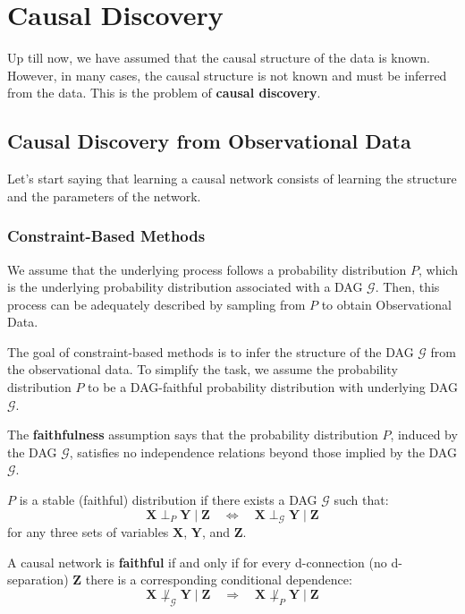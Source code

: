 \chapter{Causal Discovery}
Up till now, we have assumed that the causal structure of the data is known. However,
in many cases, the causal structure is not known and must be inferred from the data.
This is the problem of \textbf{causal discovery}.

\section{Causal Discovery from Observational Data}
Let's start saying that learning a causal network consists of learning the
structure and the parameters of the network.
\subsection{Constraint-Based Methods}
We assume that the underlying process follows a probability distribution $P$, which
is the underlying probability distribution associated with a DAG $\mathcal{G}$.
Then, this process can be adequately described by sampling from $P$ to obtain
Observational Data.

The goal of constraint-based methods is to infer the structure of the DAG $\mathcal{G}$
from the observational data. To simplify the task, we assume the probability
distribution $P$ to be a DAG-faithful probability distribution with underlying
DAG $\mathcal{G}$.

The \textbf{faithfulness} assumption says that the probability distribution $P$,
induced by the DAG $\mathcal{G}$, satisfies no independence relations beyond
those implied by the DAG $\mathcal{G}$.

\begin{definition}
    $P$ is a stable (faithful) distribution if there exists a DAG $\mathcal{G}$
    such that:
    \begin{equation}
        \mathbf{X} \perp_{P} \mathbf{Y} \mid \mathbf{Z} \quad \iff \quad \mathbf{X} \perp_{\mathcal{G}} \mathbf{Y} \mid \mathbf{Z}
    \end{equation}
    for any three sets of variables $\mathbf{X}$, $\mathbf{Y}$, and $\mathbf{Z}$.
\end{definition}

A causal network is \textbf{faithful} if and only if for every d-connection (no
d-separation) $\mathbf{Z}$ there is a corresponding conditional dependence:
\begin{equation}
    \mathbf{X} \not\perp_{\mathcal{G}} \mathbf{Y} \mid \mathbf{Z} \quad \Rightarrow \quad \mathbf{X} \not\perp_{P} \mathbf{Y} \mid \mathbf{Z}
\end{equation}


